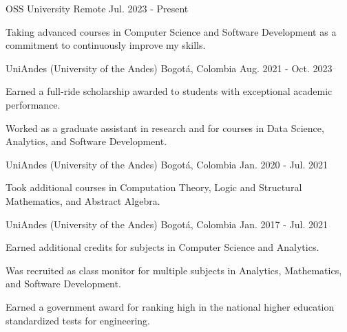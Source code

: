 

\begin{cventries}

	{OSS University} %
	{Remote} %
	{Jul. 2023 {-} Present} %
	{
		\begin{cvitems} %
			\item {Taking advanced courses in Computer Science and Software Development as a commitment to continuously improve my skills.}
		\end{cvitems}
	}

	{UniAndes (University of the Andes)} %
	{Bogotá, Colombia} %
	{Aug. 2021 {-} Oct. 2023} %
	{
		\begin{cvitems} %
			\item {Earned a full-ride scholarship awarded to students with exceptional academic performance.}
			\item {Worked as a graduate assistant in research and for courses in Data Science, Analytics, and Software Development.}
		\end{cvitems}
	}

	{UniAndes (University of the Andes)} %
	{Bogotá, Colombia} %
	{Jan. 2020 {-} Jul. 2021} %
	{
		\begin{cvitems} %
			\item {Took additional courses in Computation Theory, Logic and Structural Mathematics, and Abstract Algebra.}
		\end{cvitems}
	}

	{UniAndes (University of the Andes)} %
	{Bogotá, Colombia} %
	{Jan. 2017 {-} Jul. 2021} %
	{
		\begin{cvitems} %
			\item {Earned additional credits for subjects in Computer Science and Analytics.}
			\item {Was recruited as class monitor for multiple subjects in Analytics, Mathematics, and Software Development.}
			\item {Earned a government award for ranking high in the national higher education standardized tests for engineering.}
		\end{cvitems}
	}

\end{cventries}
